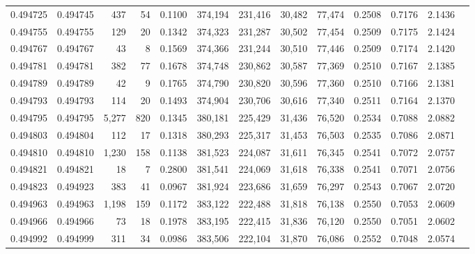 \begin{tabular}{rrrrrrrrrrrrr}
0.494725 & 0.494745 &   437 &    54 &                                     0.1100 & 374,194 & 231,416 &  30,482 &  77,474 & 0.2508 & 0.7176 & 2.1436 \\
0.494755 & 0.494755 &   129 &    20 &                                     0.1342 & 374,323 & 231,287 &  30,502 &  77,454 & 0.2509 & 0.7175 & 2.1424 \\
0.494767 & 0.494767 &    43 &     8 &                                     0.1569 & 374,366 & 231,244 &  30,510 &  77,446 & 0.2509 & 0.7174 & 2.1420 \\
0.494781 & 0.494781 &   382 &    77 &                                     0.1678 & 374,748 & 230,862 &  30,587 &  77,369 & 0.2510 & 0.7167 & 2.1385 \\
0.494789 & 0.494789 &    42 &     9 &                                     0.1765 & 374,790 & 230,820 &  30,596 &  77,360 & 0.2510 & 0.7166 & 2.1381 \\
0.494793 & 0.494793 &   114 &    20 &                                     0.1493 & 374,904 & 230,706 &  30,616 &  77,340 & 0.2511 & 0.7164 & 2.1370 \\
0.494795 & 0.494795 & 5,277 &   820 &                                     0.1345 & 380,181 & 225,429 &  31,436 &  76,520 & 0.2534 & 0.7088 & 2.0882 \\
0.494803 & 0.494804 &   112 &    17 &                                     0.1318 & 380,293 & 225,317 &  31,453 &  76,503 & 0.2535 & 0.7086 & 2.0871 \\
0.494810 & 0.494810 & 1,230 &   158 &                                     0.1138 & 381,523 & 224,087 &  31,611 &  76,345 & 0.2541 & 0.7072 & 2.0757 \\
0.494821 & 0.494821 &    18 &     7 &                                     0.2800 & 381,541 & 224,069 &  31,618 &  76,338 & 0.2541 & 0.7071 & 2.0756 \\
0.494823 & 0.494923 &   383 &    41 &                                     0.0967 & 381,924 & 223,686 &  31,659 &  76,297 & 0.2543 & 0.7067 & 2.0720 \\
0.494963 & 0.494963 & 1,198 &   159 &                                     0.1172 & 383,122 & 222,488 &  31,818 &  76,138 & 0.2550 & 0.7053 & 2.0609 \\
0.494966 & 0.494966 &    73 &    18 &                                     0.1978 & 383,195 & 222,415 &  31,836 &  76,120 & 0.2550 & 0.7051 & 2.0602 \\
0.494992 & 0.494999 &   311 &    34 &                                     0.0986 & 383,506 & 222,104 &  31,870 &  76,086 & 0.2552 & 0.7048 & 2.0574 \\

\end{tabular}
